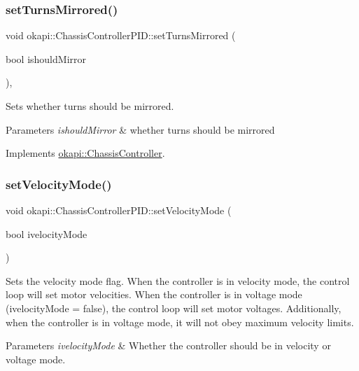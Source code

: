 \subsubsection{\texorpdfstring{setTurnsMirrored()}{setTurnsMirrored()}}
{\footnotesize\ttfamily void okapi\+::\+Chassis\+Controller\+P\+I\+D\+::set\+Turns\+Mirrored (\begin{DoxyParamCaption}\item[{bool}]{ishould\+Mirror }\end{DoxyParamCaption})\hspace{0.3cm}{\ttfamily [override]}, {\ttfamily [virtual]}}

Sets whether turns should be mirrored.


\begin{DoxyParams}{Parameters}
{\em ishould\+Mirror} & whether turns should be mirrored \\
\hline
\end{DoxyParams}


Implements \mbox{\hyperlink{classokapi_1_1ChassisController_a37ae36ec8936272eb31e3baed7eed417}{okapi\+::\+Chassis\+Controller}}.

\mbox{\label{classokapi_1_1ChassisControllerPID_a2325280ebca6ddc45fe6bc197b0dcb00}} 
\subsubsection{\texorpdfstring{setVelocityMode()}{setVelocityMode()}}
{\footnotesize\ttfamily void okapi\+::\+Chassis\+Controller\+P\+I\+D\+::set\+Velocity\+Mode (\begin{DoxyParamCaption}\item[{bool}]{ivelocity\+Mode }\end{DoxyParamCaption})}

Sets the velocity mode flag. When the controller is in velocity mode, the control loop will set motor velocities. When the controller is in voltage mode (ivelocity\+Mode = false), the control loop will set motor voltages. Additionally, when the controller is in voltage mode, it will not obey maximum velocity limits.


\begin{DoxyParams}{Parameters}
{\em ivelocity\+Mode} & Whether the controller should be in velocity or voltage mode. \\
\hline
\end{DoxyParams}
\mbox{\label{classokapi_1_1ChassisControllerPID_aaf7664abcf588a985bb8755df62eacd9}} 
